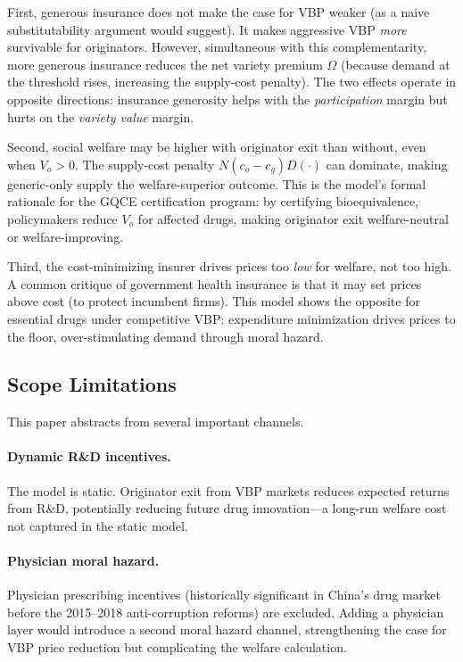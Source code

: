 \documentclass[12pt]{article}
\theoremstyle{plain}
\theoremstyle{definition}
\theoremstyle{remark}
\newcommand{\1}{\mathbf{1}}
\begin{document}
First, generous insurance does not make the case for VBP weaker (as a naive substitutability argument would suggest). It makes aggressive VBP \emph{more} survivable for originators. However, simultaneous with this complementarity, more generous insurance reduces the net variety premium $\Omega$ (because demand at the threshold rises, increasing the supply-cost penalty). The two effects operate in opposite directions: insurance generosity helps with the \emph{participation} margin but hurts on the \emph{variety value} margin.

Second, social welfare may be higher with originator exit than without, even when $V_o > 0$. The supply-cost penalty $N(c_o - c_g)D(\cdot)$ can dominate, making generic-only supply the welfare-superior outcome. This is the model's formal rationale for the GQCE certification program: by certifying bioequivalence, policymakers reduce $V_o$ for affected drugs, making originator exit welfare-neutral or welfare-improving.

Third, the cost-minimizing insurer drives prices too \emph{low} for welfare, not too high. A common critique of government health insurance is that it may set prices above cost (to protect incumbent firms). This model shows the opposite for essential drugs under competitive VBP: expenditure minimization drives prices to the floor, over-stimulating demand through moral hazard.

\subsection{Scope Limitations}

This paper abstracts from several important channels.

\paragraph{Dynamic R\&D incentives.} The model is static. Originator exit from VBP markets reduces expected returns from R\&D, potentially reducing future drug innovation---a long-run welfare cost not captured in the static model.

\paragraph{Physician moral hazard.} Physician prescribing incentives (historically significant in China's drug market before the 2015--2018 anti-corruption reforms) are excluded. Adding a physician layer would introduce a second moral hazard channel, strengthening the case for VBP price reduction but complicating the welfare calculation.
\end{document}
